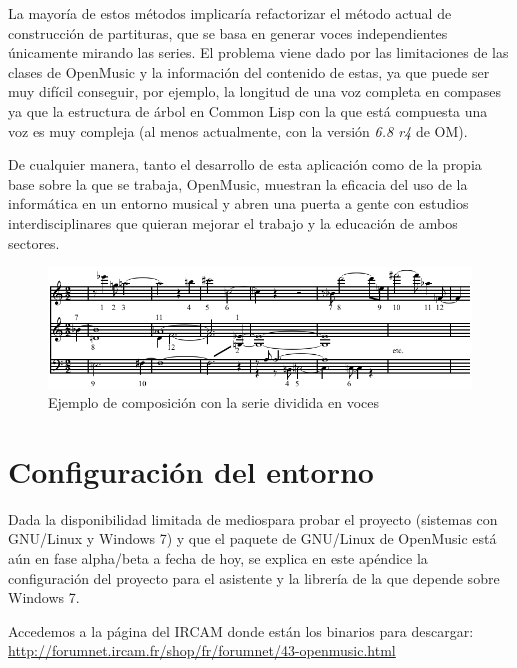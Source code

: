\documentclass[a4paper,openany,oneside,12pt]{book}
\begin{document}
La mayoría de estos métodos implicaría refactorizar el método actual de construcción de partituras, que se basa en generar voces independientes únicamente mirando las series. El problema viene dado por las limitaciones de las clases de OpenMusic y la información del contenido de estas, ya que puede ser muy difícil conseguir, por ejemplo, la longitud de una voz completa en compases ya que la estructura de árbol en Common Lisp con la que está compuesta una voz es muy compleja (al menos actualmente, con la versión \emph{6.8 r4} de OM).

De cualquier manera, tanto el desarrollo de esta aplicación como de la propia base sobre la que se trabaja, OpenMusic, muestran la eficacia del uso de la informática en un entorno musical y abren una puerta a gente con estudios interdisciplinares que quieran mejorar el trabajo y la educación de ambos sectores.

\begin{figure}
\centering
\includegraphics[width=\textwidth]{img/Schoenberg_-_Wind_Quintet_opening.png}
\caption{Ejemplo de composición con la serie dividida en voces\cite{wiki:twelvetonetechnique}} \label{fig:twelvetoneexample}
\end{figure}


\nocite{*}
\cleardoublepage
{}



\appendix
\chapter{Configuración del entorno}\label{aped.A}
Dada la disponibilidad limitada de mediospara probar el proyecto (sistemas con GNU/Linux y Windows 7) y que el paquete de GNU/Linux de OpenMusic está aún en fase alpha/beta a fecha de hoy, se explica en este apéndice la configuración del proyecto para el asistente y la librería de la que depende sobre Windows 7.

Accedemos a la página del IRCAM donde están los binarios para descargar: \url{http://forumnet.ircam.fr/shop/fr/forumnet/43-openmusic.html}
\end{document}
